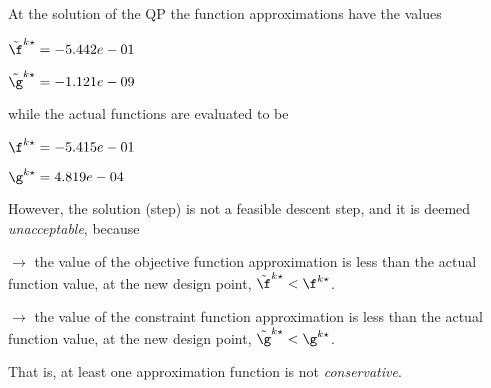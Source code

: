 At the solution of the QP the function approximations have the values

$\tilde \f^{k\star} = -5.442e-01$

$\tilde \g^{k\star} = -1.121e-09$

\bigskip
while the actual functions are evaluated to be

$\f^{k\star} = -5.415e-01$

$\g^{k\star} =  4.819e-04$

\bigskip
 However, the solution (step)                         is not a feasible descent step, and it is deemed                         \emph{unacceptable}, because 
 
$\to$ the value of the objective                             function approximation is less than the actual function                             value, at the new design point,                             $\tilde {\f}^{k\star} < {\f}^{k\star}$.

 $\to$ the value of the constraint function                             approximation is less than the actual function value, at                             the new design point, $\tilde {\g}^{k\star} < {\g}^{k\star}$.

 \bigskip 

 That is, at least one approximation                         function is not \emph{conservative}.
